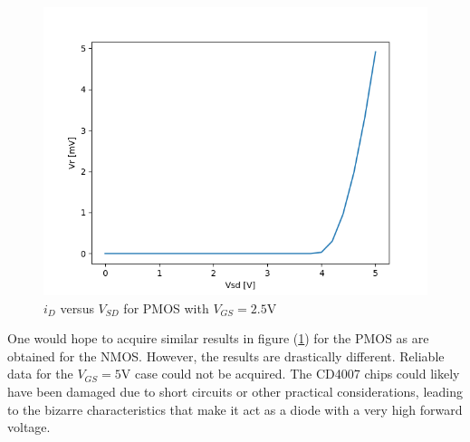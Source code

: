 
\FloatBarrier

\begin{figure}[h!]
	\centering
	\includegraphics[scale=0.75]{../images/data_4.PNG}
	\caption{$i_{D}$ versus $V_{SD}$ for PMOS with $V_{GS} = 2.5$\si{\volt}}
	\label{fig:data_4}
\end{figure}

\FloatBarrier

One would hope to acquire similar results in figure (\ref{fig:data_4}) for the PMOS as are obtained for the NMOS.
However, the results are drastically different.
Reliable data for the $V_{GS} = 5$\si{\volt} case could not be acquired.
The CD4007 chips could likely have been damaged due to short circuits or other practical considerations, leading to the bizarre characteristics that make it act as a diode with a very high forward voltage.
